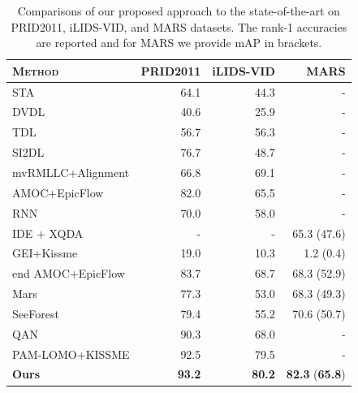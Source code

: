 \begin{table}
\center
\begin{adjustbox}{max width=0.8\textwidth}
\begin{tabular}{lrrr} 
\textsc{Method} & PRID2011 & iLIDS-VID & MARS \\
\hline
STA \cite{liu2015spatio}                  &64.1     &44.3   & -  \\ 
DVDL \cite{karanam2015person}             &40.6     &25.9   & -  \\ 
TDL \cite{you2016top}                     &56.7     &56.3   & -  \\ 
SI2DL \cite{zhu2016video}                 &76.7     &48.7   & - \\ 
mvRMLLC+Alignment \cite{chen2016person}   &66.8     &69.1   & - \\ 
AMOC+EpicFlow \cite{liu2017video}         &82.0     &65.5   & - \\ 
RNN \cite{mclaughlin2016recurrent}        &70.0     &58.0   & - \\ %
IDE \cite{zheng2016person} + XQDA \cite{liao2015person}  &- &- &65.3 (47.6) \\ 
GEI+Kissme \cite{zheng2016mars}           &19.0     &10.3   &1.2 (0.4) \\
end AMOC+EpicFlow \cite{liu2017video}     &83.7 &68.7  &68.3 (52.9) \\
Mars \cite{zheng2016mars}       &77.3  &53.0  &68.3 (49.3) \\
SeeForest \cite{zhousee}        &79.4  &55.2  &70.6 (50.7) \\ 
QAN \cite{liu2017quality}          &90.3  &68.0  & -   \\
PAM-LOMO+KISSME \cite{khan2017multi}            &92.5  &79.5  & -   \\
\hline
\textbf{Ours}                             &\textbf{93.2} &\textbf{80.2} &\textbf{82.3} (\textbf{65.8}) \\
\hline
\end{tabular}
\end{adjustbox}
\vspace{5pt}
\caption{Comparisons of our proposed approach to the state-of-the-art on PRID2011, iLIDS-VID, and MARS datasets. The rank-1 accuracies are reported and for MARS we provide mAP in brackets.}
\label{tab:statemethods}
\end{table}

